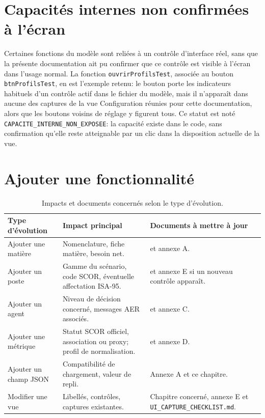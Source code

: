 \section{Capacités internes non confirmées à l'écran}

Certaines fonctions du modèle sont reliées à un contrôle d'interface réel, sans que la présente documentation ait pu confirmer que ce contrôle est visible à l'écran dans l'usage normal. La fonction \texttt{ouvrirProfilsTest}, associée au bouton \texttt{btnProfilsTest}, en est l'exemple retenu: le bouton porte les indicateurs habituels d'un contrôle actif dans le fichier du modèle, mais il n'apparaît dans aucune des captures de la vue Configuration réunies pour cette documentation, alors que les boutons voisins de réglage y figurent tous. Ce statut est noté \texttt{CAPACITE\_INTERNE\_NON\_EXPOSEE}: la capacité existe dans le code, sans confirmation qu'elle reste atteignable par un clic dans la disposition actuelle de la vue.


\section{Ajouter une fonctionnalité}

\begin{table}[H]
  \centering
  \begin{tabularx}{\textwidth}{L{0.24\textwidth} Y Y}
    \toprule
    Type d'évolution & Impact principal & Documents à mettre à jour \\
    \midrule
    Ajouter une matière & Nomenclature, fiche matière, besoin net. &  et annexe A. \\
    Ajouter un poste & Gamme du scénario, code SCOR, éventuelle affectation ISA-95. &  et annexe E si un nouveau contrôle apparaît. \\
    Ajouter un agent & Niveau de décision concerné, messages AER associés. &  et annexe C. \\
    Ajouter une métrique & Statut SCOR officiel, association ou proxy; profil de normalisation. &  et annexe D. \\
    Ajouter un champ JSON & Compatibilité de chargement, valeur de repli. & Annexe A et ce chapitre. \\
    Modifier une vue & Libellés, contrôles, captures existantes. & Chapitre concerné, annexe E et \texttt{UI\_CAPTURE\_CHECKLIST.md}. \\
    \bottomrule
  \end{tabularx}
  \caption{Impacts et documents concernés selon le type d'évolution.}
  \label{tab:impacts-evolution}
\end{table}

